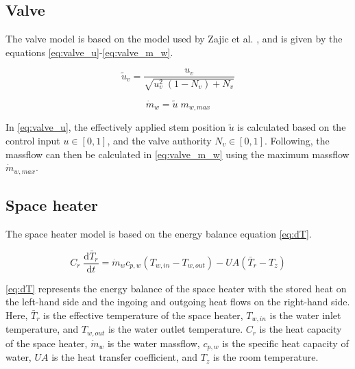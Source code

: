 \section{}
\label{sec:appendix_A}



\subsection{Valve}
The valve model is based on the model used by Zajic et al. \cite{zajic2011a}, and is given by the equations \ref{eq:valve_u}-\ref{eq:valve_m_w}. 

\begin{equation}
    \tilde{u}_v = \frac{u_v}{\sqrt{u_v^2 \; (1-N_v)+N_v}}
    \label{eq:valve_u}
\end{equation}

\begin{equation}
    \dot{m}_w = \tilde{u} \; m_{w,max}
    \label{eq:valve_m_w}
\end{equation}

In \autoref{eq:valve_u}, the effectively applied stem position $\tilde{u}$ is calculated based on the control input $u \in [0,1]$, and the valve authority $N_v \in [0,1]$. Following, the massflow can then be calculated in \autoref{eq:valve_m_w} using the maximum massflow $\dot{m}_{w,max}$. 

\subsection{Space heater}
\label{sec:space_heater}

The space heater model is based on the energy balance equation \ref{eq:dT}. 


\begin{equation}
    C_r \; \frac{\mathrm{d} \bar{T}_{r}}{\mathrm{d}t} = \dot{m}_w c_{p,w} (T_{w,in}-T_{w,out}) - U\!A (\bar{T}_{r}-T_z)
    \label{eq:dT}
\end{equation}


\autoref{eq:dT} represents the energy balance of the space heater with the stored heat on the left-hand side and the ingoing and outgoing heat flows on the right-hand side. Here, $\bar{T}_{r}$ is the effective temperature of the space heater, $T_{w,in}$ is the water inlet temperature, and $T_{w,out}$ is the water outlet temperature. $C_r$ is the heat capacity of the space heater, $\dot{m}_w$ is the water massflow, $c_{p,w}$ is the specific heat capacity of water, $U\!A$ is the heat transfer coefficient, and $T_z$ is the room temperature.


